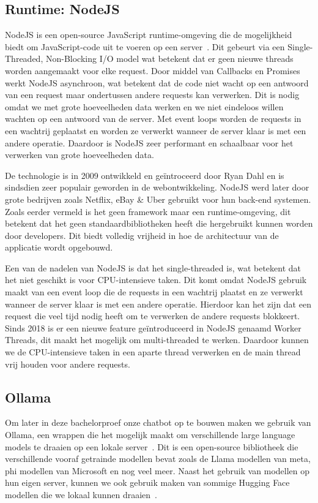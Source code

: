 \subsection{Runtime: NodeJS}
NodeJS is een open-source JavaScript runtime-omgeving die de mogelijkheid biedt om JavaScript-code uit te voeren op een server~\autocite{NodeJS2022}.
Dit gebeurt via een Single-Threaded, Non-Blocking I/O model wat betekent dat er geen nieuwe threads worden aangemaakt voor elke request.
Door middel van Callbacks en Promises werkt NodeJS asynchroon, wat betekent dat de code niet wacht op een antwoord van een request maar ondertussen andere requests kan verwerken.
Dit is nodig omdat we met grote hoeveelheden data werken en we niet eindeloos willen wachten op een antwoord van de server.
Met event loops worden de requests in een wachtrij geplaatst en worden ze verwerkt wanneer de server klaar is met een andere operatie.
Daardoor is NodeJS zeer performant en schaalbaar voor het verwerken van grote hoeveelheden data.

De technologie is in 2009 ontwikkeld en geïntroceerd door Ryan Dahl en is sindsdien zeer populair geworden in de webontwikkeling. 
NodeJS werd later door grote bedrijven zoals Netflix, eBay \& Uber gebruikt voor hun back-end systemen.
Zoals eerder vermeld is het geen framework maar een runtime-omgeving, dit betekent dat het geen standaardbibliotheken heeft die hergebruikt kunnen worden door developers.
Dit biedt volledig vrijheid in hoe de architectuur van de applicatie wordt opgebouwd.

Een van de nadelen van NodeJS is dat het single-threaded is, wat betekent dat het niet geschikt is voor CPU-intensieve taken.
Dit komt omdat NodeJS gebruik maakt van een event loop die de requests in een wachtrij plaatst en ze verwerkt wanneer de server klaar is met een andere operatie.
Hierdoor kan het zijn dat een request die veel tijd nodig heeft om te verwerken de andere requests blokkeert.
Sinds 2018 is er een nieuwe feature geïntroduceerd in NodeJS genaamd Worker Threads, dit maakt het mogelijk om multi-threaded te werken.
Daardoor kunnen we de CPU-intensieve taken in een aparte thread verwerken en de main thread vrij houden voor andere requests.

\subsection{Ollama}
Om later in deze bachelorproef onze chatbot op te bouwen maken we gebruik van Ollama, een wrappen die het mogelijk maakt om verschillende large language models te draaien op een lokale server~\autocite{Manandhar2025}. 
Dit is een open-source bibliotheek die verschillende vooraf getrainde modellen bevat zoals de Llama modellen van meta, phi modellen van Microsoft en nog veel meer.
Naast het gebruik van modellen op hun eigen server, kunnen we ook gebruik maken van sommige Hugging Face modellen die we lokaal kunnen draaien~\autocite{HuggingFace2024}.

